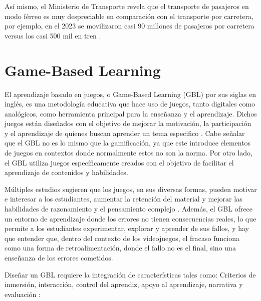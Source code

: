 Así mismo, el Ministerio de Transporte revela que el transporte de pasajeros en modo férreo es muy despreciable en comparación con el transporte por carretera, por ejemplo, en el 2023 se movilizaron casi 90 millones de pasajeros por carretera versus los casi 500 mil en tren \autocite{mintransporteDatosCarga}.

\section{Game-Based Learning}

El aprendizaje basado en juegos, o Game-Based Learning (GBL) por sus siglas en inglés, es una metodología educativa que hace uso de juegos, tanto digitales como analógicos, como herramienta principal para la enseñanza y el aprendizaje. Dichos juegos están diseñados con el objetivo de mejorar la motivación, la participación y el aprendizaje de quienes buscan aprender un tema especifico \autocite{gblHandbook2019}. Cabe señalar que el GBL no es lo mismo que la gamificación, ya que este introduce elementos de juegos en contextos donde normalmente estos no son la norma. Por otro lado, el GBL utiliza juegos específicamente creados con el objetivo de facilitar el aprendizaje de contenidos y habilidades.

Múltiples estudios sugieren que los juegos, en sus diversas formas, pueden motivar e interesar a los estudiantes, aumentar la retención del material y mejorar las habilidades de razonamiento y el pensamiento complejo \autocite{gblBeneficios}. Además, el GBL ofrece un entorno de aprendizaje donde los errores no tienen consecuencias reales, lo que permite a los estudiantes experimentar, explorar y aprender de sus fallos, y hay que entender que, dentro del contexto de los videojuegos, el fracaso funciona como una forma de retroalimentación, donde el fallo no es el final, sino una enseñanza de los errores cometidos.

Diseñar un GBL requiere la integración de características tales como: Criterios de inmersión, interacción, control del aprendiz, apoyo al aprendizaje, narrativa y evaluación \autocite{gblFrameworkExamining}:

